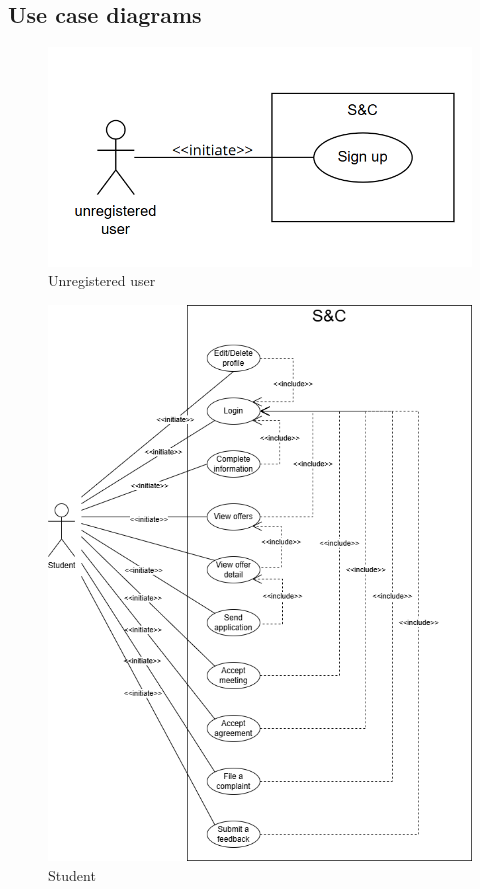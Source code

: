 \subsection{Use case diagrams}
\label{subsec: use_case_diag}%

\begin{figure}[H]
    \centering
    \includegraphics[width=1\linewidth]{Images/use case diagrams/UNREGISTERED_USER.png}
    \caption{Unregistered user}
    \label{fig:enter-label}
\end{figure}

\begin{figure}[H]
    \centering
    \includegraphics[width=1\linewidth]{Images/use case diagrams/STUDENT.png}
    \caption{Student}
    \label{fig:enter-label}
\end{figure}

